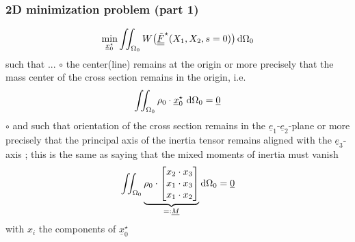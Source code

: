 \begin{frame}
  \frametitle{2D minimization problem (part 1)}

  \begin{displaymath}
    \min_{\underline{x}_0^{\star}} \iint_{\Omega_0} W \bigl( \doubleunderline{\tilde{F}}^{\star}(X_1,X_2,s=0) \bigr)  \dif \Omega_0
  \end{displaymath}
  such that ... \newline
  $\circ$ the center(line) remains at the origin or more precisely that the mass center of the cross section remains in the origin, i.e.
  \begin{displaymath}
    \iint_{\Omega_0} \rho_0 \cdot \underline{x}_0^{\star} \, \dif \Omega_0 = \underline{0}
  \end{displaymath}
  $\circ$ and such that orientation of the cross section remains in the $\underline{e}_1$-$\underline{e}_2$-plane or more precisely that the principal axis of the inertia tensor remains aligned with the $\underline{e}_3$-axis ; this is the same as saying that the mixed moments of inertia must vanish
  \begin{displaymath}
    \iint_{\Omega_0} \underbrace{ \rho_0 \cdot 
    \begin{bmatrix}
      x_2 \cdot x_3 \\
      x_1 \cdot x_3 \\
      x_1 \cdot x_2 
    \end{bmatrix} }_{=: \underline{M}}
    \dif \Omega_0 = \underline{0}
  \end{displaymath}
  with $x_i$ the components of $\underline{x}_0^{\star}$
\end{frame}


